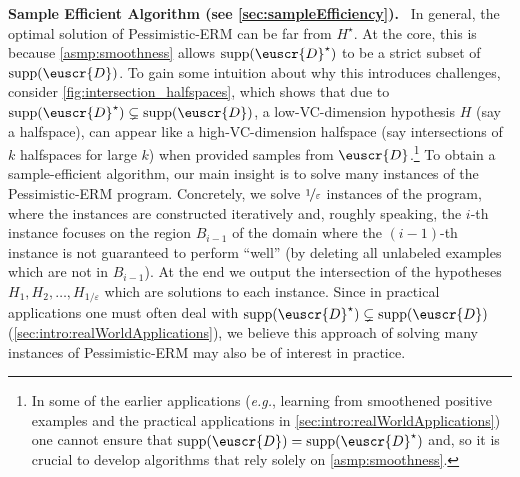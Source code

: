 \documentclass[11pt]{article}
\theoremstyle{plain}
\theoremstyle{definition}
\theoremstyle{remark}
\newcommand{\nfrac}[2]{\nicefrac{#1}{#2}}
\newcommand{\supp}{\operatorname{supp}}
\newcommand{\eps}{\varepsilon}
\newcommand{\customcal}[1]{\euscr{#1}}
\newcommand{\cD}{\customcal{D}}
\renewcommand{\paragraph}[1]{\medskip \noindent\textbf{#1}~}
\newcommand{\eg}{\textit{e.g.}}
\newcommand{\pERM}{Pessimistic-ERM}
\newcommand{\optset}{{H^\star}}
\newcommand{\cDtrue}{\cD^\star}
\begin{document}
        \paragraph{Sample Efficient Algorithm (see \cref{sec:sampleEfficiency}).}
            In general, the optimal solution of \pERM{} can be far from $\optset.$
            At the core, this is because \cref{asmp:smoothness} allows $\supp(\cDtrue)$ to be a strict subset of $\supp(\cD)$.
            To gain some intuition about why this introduces challenges, consider \cref{fig:intersection_halfspaces}, which shows that due to $\supp(\cDtrue)\subsetneq \supp(\cD)$, a low-VC-dimension hypothesis $H$ (say a halfspace), can appear like a high-VC-dimension halfspace (say intersections of $k$ halfspaces for large $k$) when provided samples from $\cD$.\footnote{In some of the earlier applications (\eg{}, learning from smoothened positive examples and the practical applications in \cref{sec:intro:realWorldApplications}) one cannot ensure that $\supp(\cD)=\supp(\cDtrue)$ and, so it is crucial to develop algorithms that rely solely on \cref{asmp:smoothness}.}
            To obtain a sample-efficient algorithm, our main insight is to solve many instances of the \pERM{} program. 
            Concretely, we solve $\nfrac{1}{\eps}$ instances of the program, where the instances are constructed iteratively and, roughly speaking, the $i$-th instance focuses on the region $B_{i-1}$ of the domain where the $(i-1)$-th instance is not guaranteed to perform ``well'' (by deleting all unlabeled examples which are not in $B_{i-1}$). 
            At the end we output the intersection of the hypotheses $H_1, H_2,\dots,H_{1/\eps}$ which are solutions to each instance.
            Since in practical applications one must often deal with $\supp(\cDtrue)\subsetneq \supp(\cD)$ (\cref{sec:intro:realWorldApplications}), we believe this approach of solving many instances of \pERM{} may also be of interest in practice.
            
\end{document}
